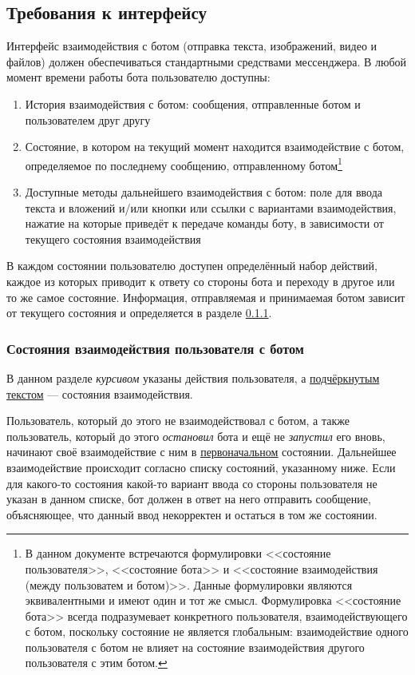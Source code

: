 \subsection{Требования к интерфейсу}
\label{sec:req:ui}
Интерфейс взаимодействия с ботом (отправка текста, изображений, видео и файлов)
должен обеспечиваться стандартными средствами мессенджера. В любой момент времени работы
бота пользователю доступны:
\begin{enumerate}
    \item
        История взаимодействия с ботом: сообщения, отправленные ботом и пользователем
        друг другу
    \item
        Состояние, в котором на текущий момент находится взаимодействие с ботом, определяемое
        по последнему сообщению, отправленному ботом\footnote{В данном документе встречаются формулировки
        <<состояние пользователя>>, <<состояние бота>> и <<состояние взаимодействия
        (между пользоватем и ботом)>>. Данные формулировки являются эквивалентными и имеют
        один и тот же смысл. Формулировка <<состояние бота>> всегда подразумевает конкретного пользователя,
        взаимодействующего с ботом, поскольку состояние не является глобальным: взаимодействие одного
        пользователя с ботом не влияет на состояние взаимодействия другого пользователя с этим ботом.}
    \item
        Доступные методы дальнейшего взаимодействия с ботом: поле для ввода текста и вложений
        и/или кнопки или ссылки с вариантами взаимодействия, нажатие на которые приведёт к передаче
        команды боту, в зависимости от текущего состояния взаимодействия
\end{enumerate}
В каждом состоянии пользователю доступен определённый набор действий, каждое из которых
приводит к ответу со стороны бота и переходу в другое или то же самое состояние.
Информация, отправляемая и принимаемая ботом зависит от текущего состояния и определяется в разделе
\ref{sec:req:ui:states}.

\subsubsection{Состояния взаимодействия пользователя с ботом}
    \label{sec:req:ui:states}
    \begingroup
    \newcommand{\action}[1]{\textit{#1}}%
    \newcommand{\state}[1]{\uline{#1}}%
    В данном разделе \action{курсивом} указаны действия пользователя, а \state{подчёркнутым текстом}
    --- состояния взаимодействия.

    Пользователь, который до этого не взаимодействовал с ботом, а также пользователь, который
    до этого \action{остановил} бота и ещё не \action{запустил} его вновь, начинают
    своё взаимодействие с ним в \hyperref[itm:req:ui:states:init]{\state{первоначальном}} состоянии.
    Дальнейшее взаимодействие происходит согласно списку состояний, указанному ниже.
    Если для какого-то состояния какой-то вариант ввода со стороны пользователя не указан в данном
    списке, бот должен в ответ на него отправить сообщение, объясняющее, что данный
    ввод некорректен и остаться в том же состоянии.

